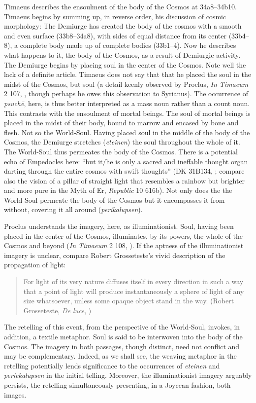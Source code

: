 Timaeus describes the ensoulment of the body of the Cosmos at 34a8--34b10. Timae\-us begins by summing up, in reverse order, his discussion of cosmic morphology: The Demiurge has created the body of the cosmos with a smooth and even surface (33b8--34a8), with sides of equal distance from its center (33b4--8), a complete body made up of complete bodies (33b1--4). Now he describes what happens to it, the body of the Cosmos, as a result of Demiurgic activity. The Demiurge begins by placing soul in the center of the Cosmos. Note well the lack of a definite article. Timaeus does not say that that he placed the soul in the midst of the Cosmos, but soul (a detail keenly observed by Proclus, \emph{In Timaeum} 2 107, \citealt{Diehl:1903re}, though perhaps he owes this observation to Syrianus). The occurrence of \emph{psuchē}, here, is thus better interpreted as a mass noun rather than a count noun. This contrasts with the ensoulment of mortal beings. The soul of mortal beings is placed in the midst of their body, bound to marrow and encased by bone and flesh. Not so the World-Soul. Having placed soul in the middle of the body of the Cosmos, the Demiurge stretches (\emph{eteinen}) the soul throughout the whole of it. The World-Soul thus permeates the body of the Cosmos. There is a potential echo of Empedocles here: ``but it/he is only a sacred and ineffable thought organ darting through the entire cosmos with swift thoughts'' (DK 31B134, \citealt[263]{Inwood:2001ve}; compare also the vision of a pillar of straight light that resembles a rainbow but brighter and more pure in the Myth of Er, \emph{Republic} 10 616b). Not only does the the World-Soul permeate the body of the Cosmos but it encompasses it from without, covering it all around (\emph{perikalupsen}). 

Proclus understands the imagery, here, as illuminationist. Soul, having been placed in the center of the Cosmos, illuminates, by its powers, the whole of the Cosmos and beyond (\emph{In Timaeum} 2 108, \citealt{Diehl:1903re}). If the aptness of the illuminationist imagery is unclear, compare Robert Grosseteste's vivid description of the propagation of light:
\begin{quote}
	For light of its very nature diffuses itself in every direction in such a way that a point of light will produce instantaneously a sphere of light of any size whatsoever, unless some opaque object stand in the way. (Robert Grosseteste, \emph{De luce}, \citealt[10]{Riedl:1942it})
\end{quote}
The retelling of this event, from the perspective of the World-Soul, invokes, in addition, a textile metaphor. Soul is said to be interwoven into the body of the Cosmos. The imagery in both passages, though distinct, need not conflict and may be complementary. Indeed, as we shall see, the weaving metaphor in the retelling potentially lends significance to the occurrences of \emph{eteinen} and \emph{periekalupsen} in the initial telling. Moreover, the illuminationist imagery arguably persists, the retelling simultaneously presenting, in a Joycean fashion, both images.

